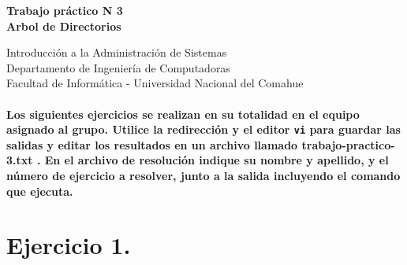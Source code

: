 \documentclass[12pt]{article}
\def\maketitle{

 \makeatletter
 {\color{bl} \centering \huge \sc \textbf{
Trabajo práctico N 3 \\
\large \vspace*{-8pt} \color{black} Arbol de Directorios
 \vspace*{8pt} }\par}
 \makeatother


 \makeatletter
 {\centering \small 
	Introducción a la Administración de Sistemas \\
 	Departamento de Ingeniería de Computadoras \\
 	Facultad de Informática - Universidad Nacional del Comahue \\
 	\vspace{20pt} }
 \makeatother

}
\begin{document}
\thispagestyle{empty}
\maketitle
\setlength{\parindent}{0pt}

\paragraph{Los siguientes ejercicios se realizan en su totalidad en el equipo asignado al grupo.
Utilice la redirección y el editor \texttt{vi} para guardar las salidas y editar los resultados 
en un archivo llamado trabajo-practico-3.txt . En el archivo de resolución indique su nombre y apellido, y el número de ejercicio a resolver, junto a la salida incluyendo el comando que ejecuta. }

\section{Ejercicio 1.}
\end{document}
